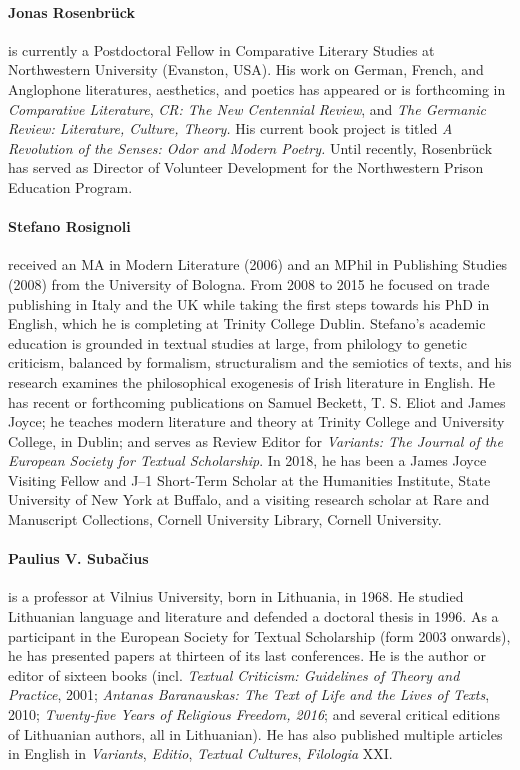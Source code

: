 \paragraph{Jonas Rosenbrück} is currently a Postdoctoral Fellow in Comparative
Literary Studies at Northwestern University (Evanston, USA). His work on
German, French, and Anglophone literatures, aesthetics, and poetics has
appeared or is forthcoming in \emph{Comparative Literature}, \emph{CR:
The New Centennial Review}, and \emph{The Germanic Review: Literature,
Culture, Theory.} His current book project is titled \emph{A Revolution
of the Senses: Odor and Modern Poetry.} Until recently, Rosenbrück has
served as Director of Volunteer Development for the Northwestern Prison
Education Program.

\paragraph{Stefano Rosignoli} received an MA in Modern Literature (2006) and an
MPhil in Publishing Studies (2008) from the University of Bologna. From
2008 to 2015 he focused on trade publishing in Italy and the UK while
taking the first steps towards his PhD in English, which he is
completing at Trinity College Dublin. Stefano's academic education is
grounded in textual studies at large, from philology to genetic
criticism, balanced by formalism, structuralism and the semiotics of
texts, and his research examines the philosophical exogenesis of Irish
literature in English. He has recent or forthcoming publications on
Samuel Beckett, T. S. Eliot and James Joyce; he teaches modern
literature and theory at Trinity College and University College, in
Dublin; and serves as Review Editor for \emph{Variants: The Journal of
the European Society for Textual Scholarship}. In 2018, he has been a
James Joyce Visiting Fellow and J--1 Short-Term Scholar at the
Humanities Institute, State University of New York at Buffalo, and a
visiting research scholar at Rare and Manuscript Collections, Cornell
University Library, Cornell University.

\paragraph{Paulius V. Subačius} is a professor at Vilnius University, born in Lithuania, in 1968. He studied Lithuanian language and literature and defended a doctoral thesis in 1996. As a participant in the European Society for Textual Scholarship (form 2003 onwards), he has presented papers at thirteen of its last conferences. He is the author or editor of sixteen books (incl. \emph{Textual Criticism: Guidelines of Theory and Practice}, 2001; \emph{Antanas Baranauskas: The Text of Life and the Lives of Texts}, 2010; \emph{Twenty-five Years of Religious Freedom, 2016}; and several critical editions of Lithuanian authors, all in Lithuanian). He has also published multiple articles in English in \textit{Variants}, \textit{Editio}, \textit{Textual Cultures}, \textit{Filologia} XXI.

